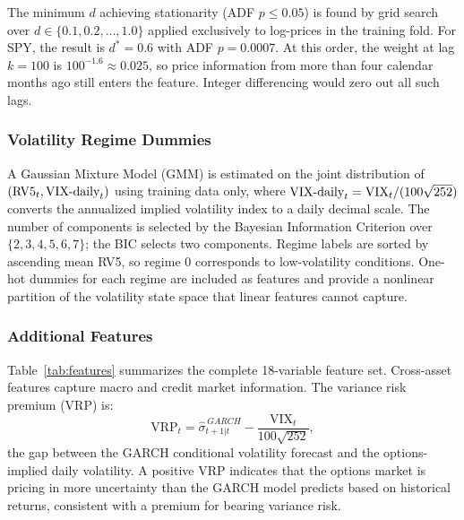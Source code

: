\documentclass[12pt]{article}
\begin{document}
The minimum $d$ achieving stationarity (ADF $p \leq 0.05$) is found by grid
search over $d \in \{0.1, 0.2, \ldots, 1.0\}$ applied exclusively to
log-prices in the training fold.  For SPY, the result is $d^{*} = 0.6$ with
ADF $p = 0.0007$.  At this order, the weight at lag $k = 100$ is
$100^{-1.6} \approx 0.025$, so price information from more than four calendar
months ago still enters the feature.  Integer differencing would zero out all
such lags.

\subsubsection*{Volatility Regime Dummies}

A Gaussian Mixture Model (GMM) is estimated on the joint distribution of
$(\text{RV5}_{t}, \text{VIX\textrm{-}daily}_{t})$ using training data only,
where $\text{VIX\textrm{-}daily}_{t} = \text{VIX}_{t}/(100\sqrt{252})$
converts the annualized implied volatility index to a daily decimal scale.
The number of components is selected by the Bayesian Information Criterion
over $\{2, 3, 4, 5, 6, 7\}$; the BIC selects two components.  Regime labels
are sorted by ascending mean RV5, so regime 0 corresponds to low-volatility
conditions.  One-hot dummies for each regime are included as features and
provide a nonlinear partition of the volatility state space that linear
features cannot capture.

\subsubsection*{Additional Features}

Table~\ref{tab:features} summarizes the complete 18-variable feature set.
Cross-asset features capture macro and credit market information.  The
variance risk premium (VRP) is:
\begin{equation}
  \text{VRP}_{t} = \hat{\sigma}_{t+1|t}^{\,GARCH}
                  - \frac{\text{VIX}_{t}}{100\sqrt{252}},
  \label{eq:vrp}
\end{equation}
the gap between the GARCH conditional volatility forecast and the
options-implied daily volatility.  A positive VRP indicates that the options
market is pricing in more uncertainty than the GARCH model predicts based on
historical returns, consistent with a premium for bearing variance risk.
\end{document}
